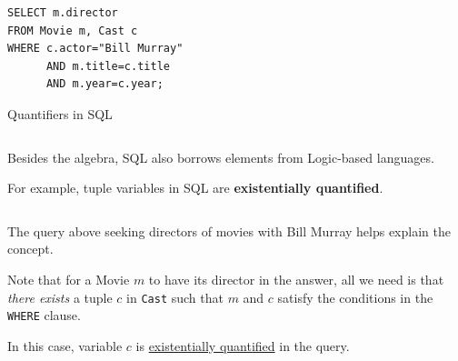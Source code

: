 \documentclass[xcolor={usenames,dvipsnames}]{beamer}
\begin{document}
%
%



%
%
%
%
\newsavebox\thereExistsExample
\begin{lrbox}{\thereExistsExample}
\begin{minipage}{0.44\textwidth}
\begin{lstlisting}[style=SQL]
SELECT m.director
FROM Movie m, Cast c
WHERE c.actor="Bill Murray"
      AND m.title=c.title
      AND m.year=c.year;
\end{lstlisting}
\end{minipage}
\end{lrbox}

%
%

\begin{frame}{Quantifiers in SQL}


\begin{columns}[onlytextwidth]
\begin{column}{0.65\textwidth}
Besides the algebra, SQL also borrows elements from Logic-based languages.

For example, tuple variables in SQL are \textbf{existentially quantified}.
\end{column}
\begin{column}{0.35\textwidth}
\scalebox{0.75}{\fbox{\usebox{\thereExistsExample}}}
\end{column}
\end{columns}

The query above seeking directors of movies with Bill Murray helps explain the concept.

Note that for a Movie $m$ to have its director in the answer, all we need is that \alert{\emph{there exists} a tuple $c$} in \lstinline[style=SQL]{Cast} such that $m$ and $c$ satisfy the conditions in the \lstinline[style=SQL]{WHERE} clause.

In this case, variable $c$ is \underline{existentially quantified} in the query.

\end{frame}

%
%
\end{document}
